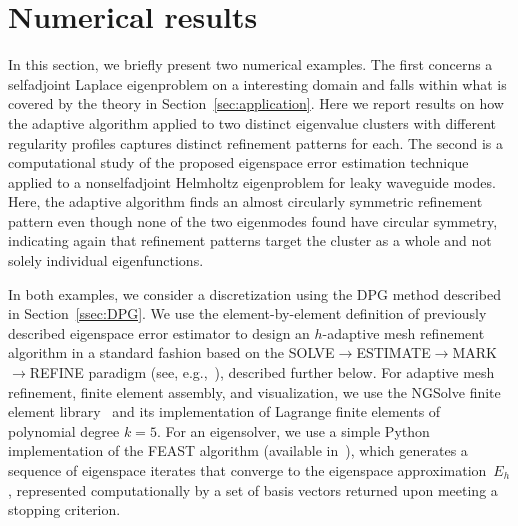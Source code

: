 \documentclass[12pt, oneside, reqno]{amsart}
\theoremstyle{remark}
\begin{document}
\section{Numerical results}

\label{sec:numerical-results}

In this section, we briefly present two numerical examples. The first
concerns  a selfadjoint Laplace eigenproblem on a interesting domain and falls
within what is covered by the theory in Section~\ref{sec:application}.
Here we report results on how the adaptive algorithm applied to two distinct
eigenvalue clusters with different regularity profiles captures distinct refinement patterns for each.
The second is a computational study of the proposed eigenspace error estimation
technique applied to a nonselfadjoint  Helmholtz eigenproblem for
leaky waveguide modes. Here, the adaptive algorithm finds an almost
circularly symmetric refinement pattern even though none  of
the two eigenmodes found have circular symmetry, indicating again
that refinement patterns target the cluster as a whole and not solely individual eigenfunctions.

In both examples, we consider  a discretization
using the DPG method described in
Section~\ref{ssec:DPG}. We use the element-by-element definition of
previously described eigenspace error estimator  to design an $h$-adaptive mesh refinement algorithm in a standard fashion  based on the
SOLVE$\rightarrow$ESTIMATE$\rightarrow$MARK$\rightarrow$REFINE paradigm (see, e.g.,~\cite{Ver1994-1}), described further below.
For adaptive mesh refinement, finite element assembly, and visualization, we use 
the NGSolve finite element library~\cite{Sch2025-1} and its implementation of
Lagrange finite elements of polynomial degree  \(k=5\).
For an eigensolver, 
we use a simple Python implementation of
the FEAST algorithm (available in~\cite{GopEtAl2025-1}), which 
generates a sequence of eigenspace iterates that converge
to the eigenspace approximation~$E_h$, represented computationally by
a set of basis vectors returned upon meeting a stopping criterion.



\end{document}
